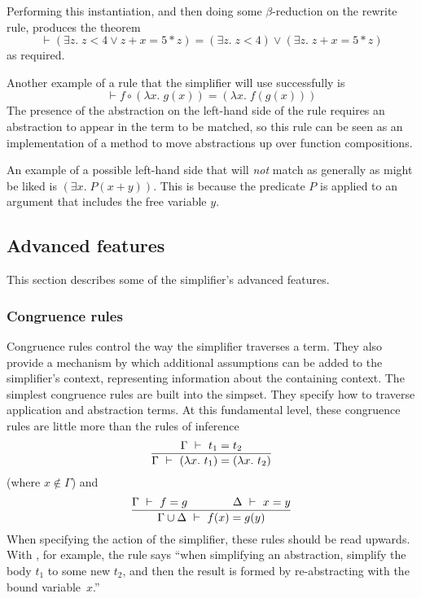 Performing this instantiation, and then doing some $\beta$-reduction
on the rewrite rule, produces the theorem\[
\vdash (\exists z. \;z < 4 \lor z + x = 5 * z) =
(\exists z. \;z < 4) \lor (\exists z.\;z + x = 5 * z)
\]
as required.

Another example of a rule that the simplifier will use successfully is
\[
\vdash f \circ (\lambda x.\; g(x)) = (\lambda x.\;f(g(x)))
\]
The presence of the abstraction on the left-hand side of the rule
requires an abstraction to appear in the term to be matched, so this
rule can be seen as an implementation of a method to move abstractions
up over function compositions.

An example of a possible left-hand side that will \emph{not} match as
generally as might be liked is $(\exists x.\;P(x + y))$.  This is
because the predicate $P$ is applied to an argument that includes the
free variable $y$.

\subsection{Advanced features}
\label{sec:advanced-simplifier}

This section describes some of the simplifier's advanced features.

\subsubsection{Congruence rules}
\label{sec:simp-congruences}

Congruence rules control the way the simplifier traverses a term.
They also provide a mechanism by which additional assumptions can be
added to the simplifier's context, representing information about the
containing context.  The simplest congruence rules are built into the
 simpset.  They specify how to traverse application and
abstraction terms.  At this fundamental level, these congruence rules
are little more than the rules of inference 
\[
\frac{\Gamma \ \vdash\  t_1 = t_2}
{\Gamma \ \vdash\  (\lambda x.\ t_1) = (\lambda x.\ t_2)}
\]
(where $x\not\in\Gamma$) and 
\[
\frac{\Gamma \ \vdash\  f = g \qquad \qquad \Delta \ \vdash\  x = y}
{\Gamma \cup \Delta \ \vdash\  f(x) = g(y)}
\]
When specifying the action of the simplifier, these rules should be
read upwards.  With , for example, the rule says ``when
simplifying an abstraction, simplify the body $t_1$ to some new $t_2$,
and then the result is formed by re-abstracting with the bound
variable~$x$.''

